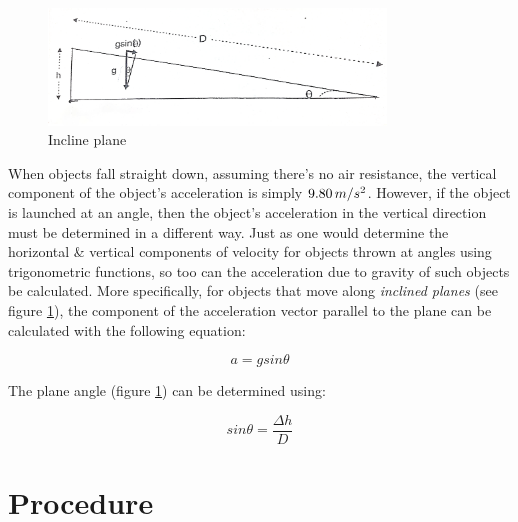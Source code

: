 \documentclass[a4paper,12pt]{article}
\begin{document}
\begin{figure}[h!]
    \centering
    \includegraphics[width=0.8\textwidth]{figure1_inclineplane} %
    \caption{Incline plane}
    \label{fig:inclineplane}
\end{figure}

When objects fall straight down, assuming there's no air resistance, the vertical component of the object's acceleration is simply $9.80\thinspace{m/s^2}$. However, if the object is launched at an angle, then the object's acceleration in the vertical direction must be determined in a different way. Just as one would determine the horizontal \& vertical components of velocity for objects thrown at angles using trigonometric functions, so too can the acceleration due to gravity of such objects be calculated. More specifically, for objects that move along \textit{inclined planes} (see figure \ref{fig:inclineplane}), the component of the acceleration vector parallel to the plane can be calculated with the following equation:

\begin{equation}
a = gsin\theta
\label{eq:1}
\end{equation}

The plane angle (figure \ref{fig:inclineplane}) can be determined using:

\begin{equation}	
sin\theta = \frac{\Delta{h}}{D}
\label{eq:2}
\end{equation}

\newpage






\section{Procedure}
\vspace{-0.5cm}
\singlespacing


\end{document}
